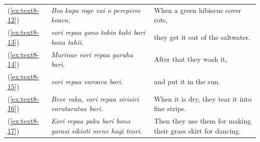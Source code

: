 \documentclass[output=paper]{langscibook}
\begin{document}
\begin{xltabular}{\textwidth}{lXX}
    (\ref{ex:text8-12})&\textit{Beo kapa roge vai o pereperee koava,}&When a green hibiscus cover rots,\\
    (\ref{ex:text8-13})&\textit{eori repaa gono takin kahi bari bona tahii.}&they get it out of the saltwater.\\
    (\ref{ex:text8-14})&\textit{Murinae eori repaa garuhu bari,}&After that they wash it,\\
    (\ref{ex:text8-15})&\textit{eori repaa varoava bari.}&and put it in the sun.\\
    (\ref{ex:text8-16})&\textit{Beve raka, eori repaa sirisiri varutarutaa bari.}&When it is dry, they tear it into fine strips.\\
    (\ref{ex:text8-17})&\textit{Eori repaa paku bari bono garasi sikioti mene hagi teori.}&Then they use them for making their grass skirt for dancing.\\
\end{xltabular}
\end{document}
